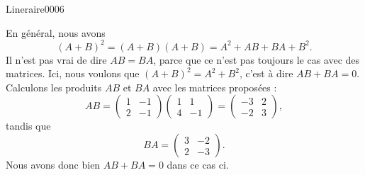 \begin{corrige}{Lineraire0006}

	En général, nous avons
	\begin{equation}
		(A+B)^2=(A+B)(A+B)=A^2+AB+BA+B^2.
	\end{equation}
	Il n'est pas vrai de dire $AB=BA$, parce que ce n'est pas toujours le cas avec des matrices. Ici, nous voulons que $(A+B)^2=A^2+B^2$, c'est à dire $AB+BA=0$. Calculons les produits $AB$ et $BA$ avec les matrices proposées :
	\begin{equation}
		AB=\begin{pmatrix}
			1	&	-1	\\ 
			2	&	-1	
		\end{pmatrix}
		\begin{pmatrix}
			1	&	1	\\ 
			4	&	-1	
		\end{pmatrix}=
		\begin{pmatrix}
			-3	&	2	\\ 
			-2	&	3	
		\end{pmatrix},
	\end{equation}
	tandis que
	\begin{equation}
		BA=\begin{pmatrix}
			3	&	-2	\\ 
			2	&	-3	
		\end{pmatrix}.
	\end{equation}
	Nous avons donc bien $AB+BA=0$ dans ce cas ci.


\end{corrige}
